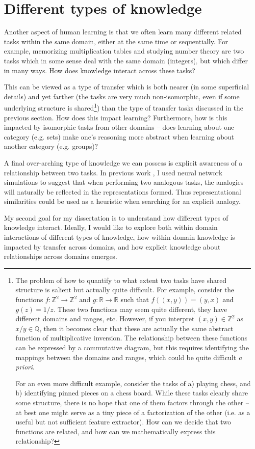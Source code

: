 \documentclass[10pt]{article}
\newcommand{\Ints}{\mathbb{Z}}
\newcommand{\Rats}{\mathbb{Q}}
\newcommand{\Reals}{\mathbb{R}}
\begin{document}
\section{Different types of knowledge}
Another aspect of human learning is that we often learn many different related tasks within the same domain, either at the same time or sequentially. For example, memorizing multiplication tables and studying number theory are two tasks which in some sense deal with the same domain (integers), but which differ in many ways. How does knowledge interact across these tasks? \par
This can be viewed as a type of transfer which is both nearer (in some superficial details) and yet farther (the tasks are very much non-isomorphic, even if some underlying structure is shared\footnote{The problem of how to quantify to what extent two tasks have shared structure is salient but actually quite difficult. For example, consider the functions \(f: \Ints^2 \rightarrow \Ints^2\) and \(g: \Reals \rightarrow \Reals\) such that \(f((x,y)) = (y, x)\) and \(g(z) = 1/z\). These two functions may seem quite different, they have different domains and ranges, etc. However, if you interpret \((x,y) \in \Ints^2\) as \(x/y \in \Rats\), then it becomes clear that these are actually the same abstract function of multiplicative inversion. The relationship between these functions can be expressed by a commutative diagram, but this requires identifying the mappings between the domains and ranges, which could be quite difficult \emph{a priori}.\par
For an even more difficult example, consider the tasks of a) playing chess, and b) identifying pinned pieces on a chess board. While these tasks clearly share some structure, there is no hope that one of them factors through the other -- at best one might serve as a tiny piece of a factorization of the other (i.e. as a useful but not sufficient feature extractor). How can we decide that two functions are related, and how can we mathematically express this relationship?}) than the type of transfer tasks discussed in the previous section. How does this impact learning? Furthermore, how is this impacted by isomorphic tasks from other domains -- does learning about one category (e.g. sets) make one's reasoning more abstract when learning about another category (e.g. groups)? \par 
A final over-arching type of knowledge we can possess is explicit awareness of a relationship between two tasks. In previous work \citep{Lampinen2017a}, I used neural network simulations to suggest that when performing two analogous tasks, the analogies will naturally be reflected in the representations formed. Thus representational similarities could be used as a heuristic when searching for an explicit analogy. \par
My second goal for my dissertation is to understand how different types of knowledge interact. Ideally, I would like to explore both within domain interactions of different types of knowledge, how within-domain knowledge is impacted by transfer across domains, and how explicit knowledge about relationships across domains emerges. \par 
\end{document}

